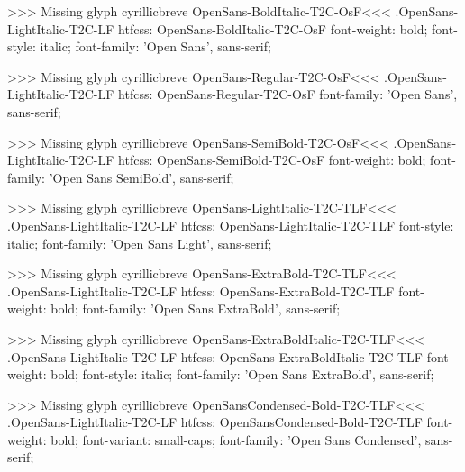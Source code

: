 >>>
Missing glyph	cyrillicbreve
\<OpenSans-BoldItalic-T2C-OsF\><<<
.OpenSans-LightItalic-T2C-LF
htfcss:  OpenSans-BoldItalic-T2C-OsF  font-weight: bold; font-style: italic; font-family: 'Open Sans', sans-serif;

>>>
Missing glyph	cyrillicbreve
\<OpenSans-Regular-T2C-OsF\><<<
.OpenSans-LightItalic-T2C-LF
htfcss:  OpenSans-Regular-T2C-OsF  font-family: 'Open Sans', sans-serif;

>>>
Missing glyph	cyrillicbreve
\<OpenSans-SemiBold-T2C-OsF\><<<
.OpenSans-LightItalic-T2C-LF
htfcss:  OpenSans-SemiBold-T2C-OsF  font-weight: bold; font-family: 'Open Sans SemiBold', sans-serif;

>>>
Missing glyph	cyrillicbreve
\<OpenSans-LightItalic-T2C-TLF\><<<
.OpenSans-LightItalic-T2C-LF
htfcss:  OpenSans-LightItalic-T2C-TLF  font-style: italic; font-family: 'Open Sans Light', sans-serif;

>>>
Missing glyph	cyrillicbreve
\<OpenSans-ExtraBold-T2C-TLF\><<<
.OpenSans-LightItalic-T2C-LF
htfcss:  OpenSans-ExtraBold-T2C-TLF  font-weight: bold; font-family: 'Open Sans ExtraBold', sans-serif;

>>>
Missing glyph	cyrillicbreve
\<OpenSans-ExtraBoldItalic-T2C-TLF\><<<
.OpenSans-LightItalic-T2C-LF
htfcss:  OpenSans-ExtraBoldItalic-T2C-TLF  font-weight: bold; font-style: italic; font-family: 'Open Sans ExtraBold', sans-serif;

>>>
Missing glyph	cyrillicbreve
\<OpenSansCondensed-Bold-T2C-TLF\><<<
.OpenSans-LightItalic-T2C-LF
htfcss:  OpenSansCondensed-Bold-T2C-TLF  font-weight: bold; font-variant: small-caps; font-family: 'Open Sans Condensed', sans-serif;

